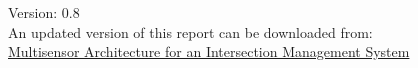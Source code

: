 \begin{titlepage}
    \begin{center}
%   
%        
%		        
%        
%        
%        
%		
%        

Version: 0.8 \\
\vspace{2cm}
An updated version of this report can be downloaded from: \\
\href{https://github.com/gustavovelascoh/msc-report/raw/master/main.pdf}{Multisensor Architecture for an Intersection Management System}      
    \end{center}
\end{titlepage}